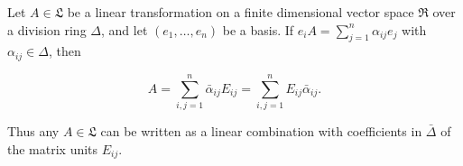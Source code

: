 Let $A \in \mathfrak{L}$ be a linear transformation on a finite dimensional vector space $\mathfrak{R}$ over a division ring $\Delta$, and let $(e_1, \dots, e_n)$ be a basis. If $e_i A = \sum_{j=1}^n \alpha_{ij} e_j$ with $\alpha_{ij} \in \Delta$, then

$$A = \sum_{i,j=1}^n \bar{\alpha}_{ij} E_{ij} = \sum_{i,j=1}^n E_{ij} \bar{\alpha}_{ij}.$$

Thus any $A \in \mathfrak{L}$ can be written as a linear combination with coefficients in $\bar{\Delta}$ of the matrix units $E_{ij}$.

